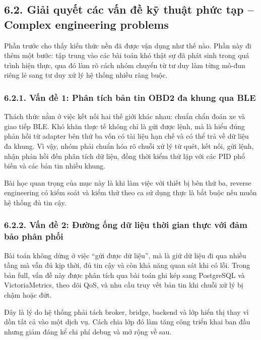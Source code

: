 \documentclass[a4paper]{extarticle}
\begin{document}
\subsection{6.2. Giải quyết các vấn đề kỹ thuật phức tạp -- Complex engineering problems}\label{62-giux1ea3i-quyux1ebft-cuxe1c-vux1ea5n-ux111ux1ec1-kux1ef9-thuux1eadt-phux1ee9c-tux1ea1p--complex-engineering-problems}

Phần trước cho thấy kiến thức nền đã được vận dụng như thế nào. Phần này đi thêm một bước: tập trung vào các bài toán khó thật sự đã phát sinh trong quá trình hiện thực, qua đó làm rõ cách nhóm chuyển từ tư duy làm từng mô-đun riêng lẻ sang tư duy xử lý hệ thống nhiều ràng buộc.

\subsubsection{6.2.1. Vấn đề 1: Phân tích bản tin OBD2 đa khung qua
BLE}\label{621-vux1ea5n-ux111ux1ec1-1-phuxe2n-tuxedch-bux1ea3n-tin-obd2-ux111a-khung-qua-ble}

Thách thức nằm ở việc kết nối hai thế giới khác nhau: chuẩn chẩn đoán xe và giao tiếp BLE. Khó khăn thực tế không chỉ là gửi được lệnh, mà là hiểu đúng phản hồi từ adapter bên thứ ba vốn có tài liệu hạn chế và có thể trả về dữ liệu đa khung. Vì vậy, nhóm phải chuẩn hóa rõ chuỗi xử lý từ quét, kết nối, gửi lệnh, nhận phản hồi đến phân tích dữ liệu, đồng thời kiểm thử lặp với các PID phổ biến và các bản tin nhiều khung.

Bài học quan trọng của mục này là khi làm việc với thiết bị bên thứ ba, reverse engineering có kiểm soát và kiểm thử theo ca sử dụng thực là bắt buộc nếu muốn hệ thống đủ tin cậy.

\subsubsection{6.2.2. Vấn đề 2: Đường ống dữ liệu thời gian thực với đảm
bảo phân phối}\label{622-vux1ea5n-ux111ux1ec1-2-ux111ux1b0ux1eddng-ux1ed1ng-dux1eef-liux1ec7u-thux1eddi-gian-thux1ef1c-vux1edbi-ux111ux1ea3m-buxe1o-phuxe2n-phux1ed1i}

Bài toán không dừng ở việc “gửi được dữ liệu”, mà là giữ dữ liệu đi qua nhiều tầng mà vẫn đủ kịp thời, đủ tin cậy và còn khả năng quan sát khi có lỗi. Trong bản full, vấn đề này được phân tích qua bài toán ghi kép sang PostgreSQL và VictoriaMetrics, theo dõi QoS, và nhu cầu truy vết bản tin khi chuỗi xử lý bị chậm hoặc đứt.

Đây là lý do hệ thống phải tách broker, bridge, backend và lớp hiển thị thay vì dồn tất cả vào một dịch vụ. Cách chia lớp đó làm tăng công triển khai ban đầu nhưng giảm đáng kể chi phí debug và mở rộng về sau.
\end{document}
